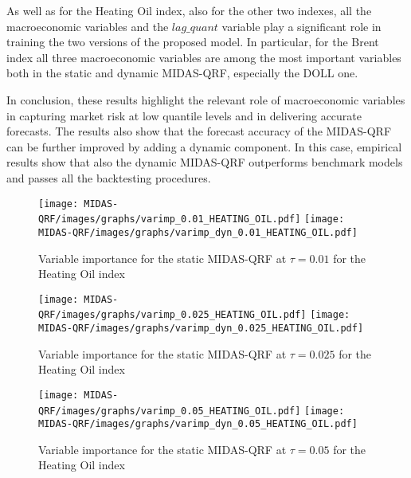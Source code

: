 \vspace{0.15in}

\noindent As well as for the Heating Oil index, also for the other two indexes, all the macroeconomic variables and the $lag\_quant$ variable play a significant role in training the two versions of the proposed model. In particular, for the Brent index all three macroeconomic variables are among the most important variables both in the static and dynamic MIDAS-QRF, especially the DOLL one.

\vspace{0.15in}

\noindent In conclusion, these results highlight the relevant role of macroeconomic variables in capturing market risk at low quantile levels and in delivering accurate forecasts. The results also show that the forecast accuracy of the MIDAS-QRF can be further improved by adding a dynamic component. In this case, empirical results show that also the dynamic MIDAS-QRF outperforms benchmark models and passes all the backtesting procedures.

\begin{figure}[H]
    \centering
    \captionsetup{width=.8\linewidth}
\texttt{[image: MIDAS-QRF/images/graphs/varimp\_0.01\_HEATING\_OIL.pdf]}
\texttt{[image: MIDAS-QRF/images/graphs/varimp\_dyn\_0.01\_HEATING\_OIL.pdf]}
\caption{Variable importance for the static MIDAS-QRF at $\tau=0.01$ for the Heating Oil index}
\label{fig:imp_01}
\end{figure}

\begin{figure}[H]
    \centering
    \texttt{[image: MIDAS-QRF/images/graphs/varimp\_0.025\_HEATING\_OIL.pdf]}
    \texttt{[image: MIDAS-QRF/images/graphs/varimp\_dyn\_0.025\_HEATING\_OIL.pdf]}
    \caption{Variable importance for the static MIDAS-QRF at $\tau=0.025$ for the Heating Oil index}
    \label{fig:imp_025}
\end{figure}


\begin{figure}[H]
    \centering
    \texttt{[image: MIDAS-QRF/images/graphs/varimp\_0.05\_HEATING\_OIL.pdf]}
    \texttt{[image: MIDAS-QRF/images/graphs/varimp\_dyn\_0.05\_HEATING\_OIL.pdf]}
    \caption{Variable importance for the static MIDAS-QRF at $\tau=0.05$ for the Heating Oil index}
    \label{fig:imp_05}
\end{figure}


